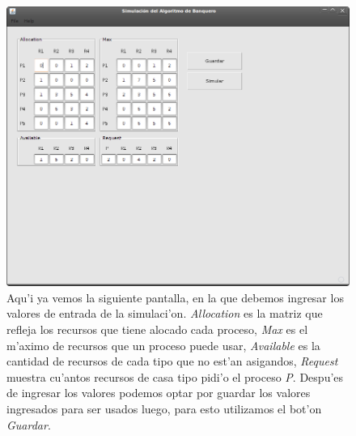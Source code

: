 \begin{figure}[h!]
\begin{center}
 \includegraphics[scale=0.3,keepaspectratio=true]{./imagenes/banquero/banquero2.png}
 \caption{Aqu'i ya vemos la siguiente pantalla, en la que debemos ingresar los valores de entrada de la simulaci'on. \emph{Allocation} es la matriz que refleja los recursos que tiene alocado cada proceso, \emph{Max} es el m'aximo de recursos que un proceso puede usar, \emph{Available} es la cantidad de recursos de cada tipo que no est'an asigandos, \emph{Request} muestra cu'antos recursos de casa tipo pidi'o el proceso \emph{P}. Despu'es de ingresar los valores podemos optar por guardar los valores ingresados para ser usados luego, para esto utilizamos el bot'on \emph{Guardar}.}
\end{center}
\end{figure}
\newpage
